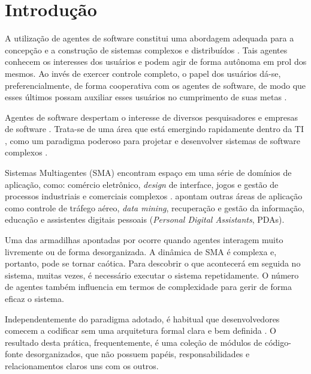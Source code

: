 \chapter[Introdução]{Introdução}

A utilização de agentes de software constitui uma abordagem adequada para a concepção e a construção de sistemas complexos e distribuídos \cite{silva2003padroes}. Tais agentes conhecem os interesses dos usuários e podem agir de forma autônoma em prol dos mesmos. Ao invés de exercer controle completo, o papel dos usuários dá-se, preferencialmente, de forma cooperativa com os agentes de software, de modo que esses últimos possam auxiliar esses usuários no cumprimento de suas metas \cite{green1997}.

Agentes de software despertam o interesse de diversos pesquisadores e empresas de software \cite{green1997}. Trata-se de uma área que está emergindo rapidamente dentro da TI \cite{jennings1996}, como um paradigma poderoso para projetar e desenvolver sistemas de software complexos \cite{zambonelli2001}. 


Sistemas Multiagentes (SMA) encontram espaço em uma série de domínios de aplicação, como: comércio eletrônico, \textit{design} de interface, jogos e gestão de processos industriais e comerciais complexos \cite{jennings1996}.  apontam outras áreas de aplicação como controle de tráfego aéreo, \textit{data mining}, recuperação e gestão da informação, educação e assistentes digitais pessoais (\textit{Personal Digital Assistants}, PDAs).

Uma das armadilhas apontadas por  ocorre quando agentes interagem muito livremente ou de forma desorganizada. A dinâmica de SMA é complexa e, portanto, pode se tornar caótica. Para descobrir o que acontecerá em seguida no sistema, muitas vezes, é necessário executar o sistema repetidamente. O número de agentes também influencia em termos de complexidade para gerir de forma eficaz o sistema. 

Independentemente do paradigma adotado, é habitual que desenvolvedores comecem a codificar sem uma arquitetura formal clara e bem definida \cite{richards2015software}. O resultado desta prática, frequentemente, é uma coleção de módulos de código-fonte desorganizados, que não possuem papéis, responsabilidades e relacionamentos claros uns com os outros. 

